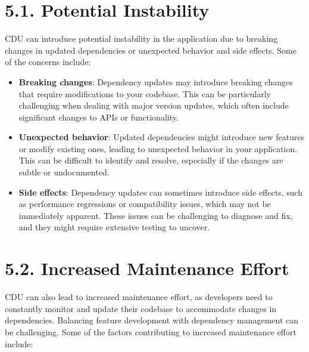 \documentclass[10pt]{article}
\begin{document}
\section*{5.1. Potential Instability}

CDU can introduce potential instability in the application due to breaking changes in updated dependencies or unexpected behavior and side effects. Some of the concerns include:

\begin{itemize}

  \item \textbf{Breaking changes}: Dependency updates may introduce breaking changes that require modifications to your codebase. This can be particularly challenging when dealing with major version updates, which often include significant changes to APIs or functionality.

  \item \textbf{Unexpected behavior}: Updated dependencies might introduce new features or modify existing ones, leading to unexpected behavior in your application. This can be difficult to identify and resolve, especially if the changes are subtle or undocumented.

  \item \textbf{Side effects}: Dependency updates can sometimes introduce side effects, such as performance regressions or compatibility issues, which may not be immediately apparent. These issues can be challenging to diagnose and fix, and they might require extensive testing to uncover.

\end{itemize}

\section*{5.2. Increased Maintenance Effort}

CDU can also lead to increased maintenance effort, as developers need to constantly monitor and update their codebase to accommodate changes in dependencies. Balancing feature development with dependency management can be challenging. Some of the factors contributing to increased maintenance effort include:
\end{document}
